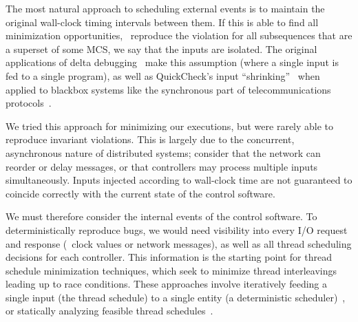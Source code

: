  The most natural approach to scheduling
external events is to maintain the original wall-clock timing intervals
between them.
If this is able to find all minimization opportunities,
\ie~reproduce the violation for all
subsequences that are a superset of some MCS, we say that the inputs are
isolated. The original applications of delta
debugging~\cite{Zeller:1999:YMP:318773.318946} make this assumption (where a
single input is fed to a single program), as well as QuickCheck's input ``shrinking''~\cite{claessen2000quickcheck}
when applied to blackbox systems like the synchronous part of
telecommunications protocols~\cite{arts2006testing}.

We tried this approach for minimizing our executions, but were rarely
able to reproduce invariant violations. This is largely due
to the concurrent, asynchronous nature of distributed systems; consider that the network
can reorder or delay messages, or that controllers may
process multiple inputs simultaneously.
Inputs injected according to wall-clock time are not guaranteed to
coincide correctly with the current state of the control software.

We must therefore consider the internal events of the control software. To deterministically
reproduce bugs, we would need visibility into every I/O request and response (\eg~clock
values or network messages), as well as all thread scheduling
decisions for each controller. This information is the starting point for thread schedule
minimization
techniques, which seek to minimize thread interleavings leading up to race conditions.
These approaches involve iteratively feeding a single input (the thread
schedule) to a single entity (a deterministic scheduler)~\cite{choi2002isolating,claessen2009finding,jalbert2010trace}, or
statically analyzing feasible thread schedules~\cite{huang2011efficient}.

